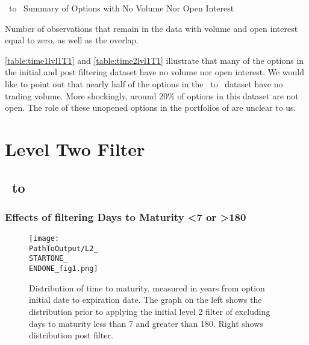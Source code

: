 \begin{appendix}
\begin{table}[ht]

\centering
{}
\caption{\STARTTWO\ to \ENDONE\ Summary of Options with No Volume Nor Open Interest}



\caption*{
  Number of observations that remain in the data with volume and open interest equal to zero, as well as the overlap. 
}
\label{table:time2lvl1T1}
\end{table}

\autoref{table:time1lvl1T1} and \autoref{table:time2lvl1T1} illustrate that many of the options in the initial and post filtering dataset have no volume nor open interest. We would like to point out that nearly half of the options in the \STARTONE\ to \ENDONE\ dataset have no trading volume. More shockingly, around 20\% of options in this dataset are not open. The role of these unopened options in the portfolios of \citet{constantinides2013} are unclear to us. 

\newpage

\section{Level Two Filter}\label{app:lvl2}
\subsection{\STARTONE\ to \ENDONE }

\subsubsection{Effects of filtering Days to Maturity <7 or >180}
\begin{figure}[H] %
  \centering
  \texttt{[image: \\PathToOutput/L2\_\\STARTONE\_\\ENDONE\_fig1.png]}%
  \caption{Distribution of time to maturity, measured in years from option initial date to expiration date. The graph on the left shows the distribution prior to applying the initial level 2 filter of excluding days to maturity less than 7 and greater than 180. Right shows distribution post filter.}
\label{fig:time1lvl2fig1}
\end{figure}


\end{appendix}
